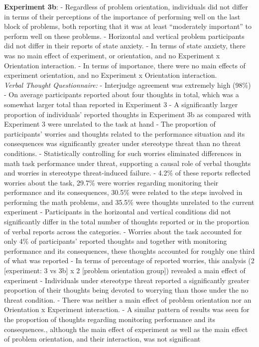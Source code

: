 \documentclass[
  doc, a4paper]{apa7}
\begin{document}
\textbf{Experiment 3b}:
- Regardless of problem orientation, individuals did not differ in terms of their perceptions of the importance of performing well on the last block of problems, both reporting that it was at least ``moderately important'' to perform well on these problems.
- Horizontal and vertical problem participants did not differ in their reports of state anxiety.
- In terms of state anxiety, there was no main effect of experiment, or orientation, and no Experiment x Orientation interaction.
- In terms of importance, there were no main effects of experiment orientation, and no Experiment x Orientation interaction.\\
\emph{Verbal Thought Questionnaire:}
- Interjudge agreement was extremely high (98\%)
- On average participants reported about four thoughts in total, which was a somewhat larger total than reported in Experiment 3
- A significantly larger proportion of individuals' reported thoughts in Experiment 3b as compared with Experiment 3 were unrelated to the task at hand
- The proportion of participants' worries and thoughts related to the performance situation and its consequences was significantly greater under stereotype threat than no threat conditions.
- Statistically controlling for such worries eliminated differences in math task performance under threat, supporting a causal role of verbal thoughts and worries in stereotype threat-induced failure.
- 4.2\% of these reports reflected worries about the task, 29.7\% were worries regarding monitoring their performance and its consequences, 30.5\% were related to the steps involved in performing the math problems, and 35.5\% were thoughts unrelated to the current experiment
- Participants in the horizontal and vertical conditions did not significantly differ in the total number of thoughts reported or in the proportion of verbal reports across the categories.
- Worries about the task accounted for only 4\% of participants' reported thoughts and together with monitoring performance and its consequences, these thoughts accounted for roughly one third of what was reported
- In terms of percentage of reported worries, this analysis (2 {[}experiment: 3 vs 3b{]} x 2 {[}problem orientation group{]}) revealed a main effect of experiment
- Individuals under stereotype threat reported a significantly greater proportion of their thoughts being devoted to worrying than those under the no threat condition.
- There was neither a main effect of problem orientation nor an Orientation x Experiment interaction.
- A similar pattern of results was seen for the proportion of thoughts regarding monitoring performance and its consequences., although the main effect of experiment as well as the main effect of problem orientation, and their interaction, was not significant
\end{document}
